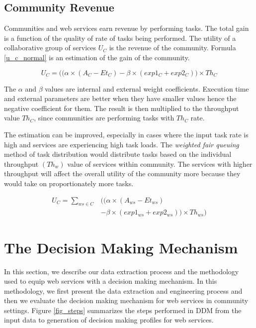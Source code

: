 \subsection{Community Revenue}

Communities and web services earn revenue by performing tasks. The total gain is a function of the quality of rate of tasks being performed. The utility of a collaborative group of services $U_{C}$ is the revenue of the community. Formula \ref{u_c_normal} is an estimation of the gain of the community.

\begin{equation}\label{u_c_normal}
U_{C} = \big((\alpha \times (A_{C} - Et_{C}) - \beta \times (exp1_{C} + exp2_{C})\big) \times Th_{C}
\end{equation}

The $\alpha$ and $\beta$ values are internal and external weight coefficients. Execution time and external parameters are better when they have smaller values hence the negative coefficient for them. The result is then multiplied to the throughput value $Th_{C}$, since communities are performing tasks with $Th_{C}$ rate.

The estimation can be improved, especially in cases where the input task rate is high and services are experiencing high task loads. The \emph{weighted fair queuing} method of task distribution would distribute tasks based on the individual throughput $(Th_{w})$ value of services within community. The services with higher throughput will affect the overall utility of the community more because they would take on proportionately more tasks.

\begin{equation}\label{u_c_load}
\begin{split}
U_{C} = \sum_{ws \in C}&\bigg(\big(\alpha \times (A_{ws} - Et_{ws}) \\
        & - \beta \times (exp1_{ws} + exp2_{ws})\big) \times Th_{ws}\bigg)
\end{split}
\end{equation}


\section{The Decision Making Mechanism}\label{s:model}

In this section, we describe our data extraction process and the methodology used to equip web services with a decision making mechanism. In this methodology, we first present the data extraction and engineering process and then we evaluate the decision making mechanism for web services in community settings. Figure \ref{fig_steps} summarizes the steps performed in DDM from the input data to generation of decision making profiles for web services.

